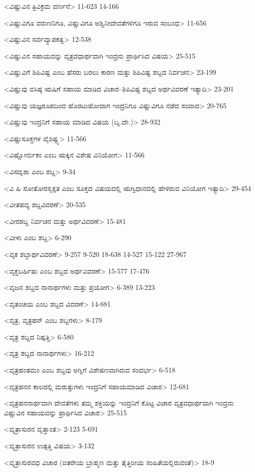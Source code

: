 <ವಿಷ್ಣುವಿನ ತ್ರಿವಿಕ್ರಮ ವರ್ಣನೆ>
11-623
14-166

<ವಿಷ್ಣುವಿಗೂ ವರುಣನಿಗೂ, ವಿಷ್ಣುವಿಗೂ ಅಶ್ವಿನೀದೇವತೆಗಳಿಗೂ ಇರುವ ಸಂಬಂಧ>
11-656

<ವಿಷ್ಣುವಿನ ಸರ್ವವ್ಯಾಪಕತ್ವ>
12-538

<ವಿಷ್ಣುವಿನ ಸಹಾಯವನ್ನು ವೃತ್ರವಧಾರ್ಥವಾಗಿ ಇಂದ್ರನು ಪ್ರಾರ್ಥಿಸಿದ ವಿಷಯ>
25-515

<ವಿಷ್ಣುವಿಗೆ ಶಿಪಿವಿಷ್ಟ ಎಂಬ ಹೆಸರು ಬರಲು ಕಾರಣ ಮತ್ತು ಶಿಪಿವಿಷ್ಟ ಶಬ್ದದ ನಿರ್ವಚನ>
23-199

<ವಿಷ್ಣುವು ವಸಿಷ್ಠ ಋಷಿಗೆ ಸಹಾಯ ಮಾಡಿದ ವಿಚಾರ–ಶಿಪಿವಿಷ್ಟ ಶಬ್ದದ ಅರ್ಥವಿವರಣೆ ಇತ್ಯಾದಿ>
23-201

<ವಿಷ್ಣುವು ಯಜ್ಞರೂಪದಿಂದ ಹೊರಟುಹೋದಾಗ ಇಂದ್ರನಿಗೂ ವಿಷ್ಣುವಿಗೂ ನಡೆದ ಸಂವಾದ>
20-765

<ವಿಷ್ಣುವು ಇಂದ್ರನಿಗೆ ಸಹಾಯ ಮಾಡಿದ ವಿಷಯ (ಬೃ.ದೇ.)>
28-932

<ವಿಷ್ಣುಸೂಕ್ತಗಳ ವೈಶಿಷ್ಟ್ಯ>
11-566

<ವಿಷ್ಣೋರ್ನುಕಂ ಎಂಬ ಋಕ್ಕಿನ ವಿಶೇಷ ವಿನಿಯೋಗ>
11-566

<ವಿಸದೃಶಾ ಎಂಬ ಶಬ್ದ>
9-34

<ವಿ ಹಿ ಸೋತೋರಸೃಕ್ಷತ ಎಂಬ ಸೂಕ್ತದ ವಿಷಯದಲ್ಲಿ ಋಗ್ವಿಧಾನದಲ್ಲಿ ಹೇಳಿರುವ ವಿನಿಯೋಗ ಇತ್ಯಾದಿ>
29-454

<ವೀತಹವ್ಯ ಶಬ್ದವಿವರಣೆ>
20-535

<ವೀರಶಬ್ದ ನಿರ್ವಚನ ಮತ್ತು ಅರ್ಥವಿವರಣೆ>
15-481

<ವೀಳು ಎಂಬ ಶಬ್ದ>
6-290

<ವೃಕ ಶಬ್ದಾರ್ಥವಿವರಣೆ>
9-257 
9-520
18-638 
14-527
15-122
27-967

<ವೃಕ್ತಬರ್ಹಿಷಃ ಎಂಬ ಶಬ್ದದ ಅರ್ಥವಿವರಣೆ>
15-577
17-476

<ವೃಜನ ಶಬ್ದದ ನಾನಾರ್ಥಗಳು ಮತ್ತು ಪ್ರಯೋಗ>
6-389
13-223

<ವೃತಂಚಯ ಎಂಬ ಶಬ್ದದ ವಿವರಣೆ>
14-881

<ವೃತ್ರ, ವೃತ್ರಹನ್‍ ಎಂಬ ಶಬ್ದಗಳು>
8-179

<ವೃತ್ರ ಶಬ್ದದ ನಿಷ್ಪತ್ತಿ>
6-580

<ವೃತ್ರ ಶಬ್ದದ ನಾನಾರ್ಥಗಳು>
16-212

<ವೃತ್ರಹಂತಮಂ ಎಂಬ ಶಬ್ದವು ಅಗ್ನಿಗೆ ವಿಶೇಷಣವಾಗಿರುವ ಸಂದರ್ಭ>
6-518

<ವೃತ್ರಹನನ ಕಾಲದಲ್ಲಿ ಮರುತ್ತುಗಳು ಇಂದ್ರನಿಗೆ ಸಹಾಯಮಾಡಿದ ವಿಚಾರ>
12-681

<ವೃತ್ರಹನನಾರ್ಥವಾಗಿ ದೇವತೆಗಳು ತಮ್ಮ ಶಕ್ತಿಯನ್ನು ಇಂದ್ರನಿಗೆ ಕೊಟ್ಟ ವಿಚಾರ ವೃತ್ರವಧಾರ್ಥವಾಗಿ ಇಂದ್ರನು ವಿಷ್ಣುವಿನ ಸಹಾಯವನ್ನು ಪ್ರಾರ್ಥಿಸಿದ ವಿಚಾರ>
25-515

<ವೃತ್ರಾಸುರನ ವೃತ್ತಾಂತ>
2-123
5-691

<ವೃತ್ರಾಸುರನ ಉತ್ಪತ್ತಿ ವಿಷಯ>
3-132

<ವೃತ್ರಾಸುರವಧ ವಿಚಾರ (ಐತರೇಯ ಬ್ರಾಹ್ಮಣ ಮತ್ತು ತೈತ್ತಿರೀಯ ಸಂಹಿತೆಯಲ್ಲಿರುವಂತೆ)>
18-9

